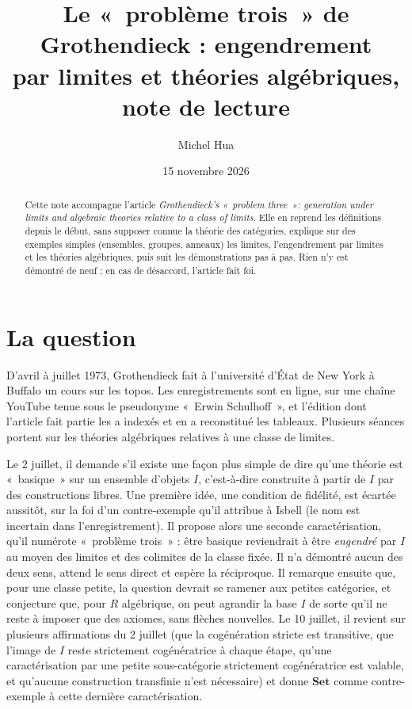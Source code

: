 \documentclass[11pt,a4paper]{amsart}
\title[Note de lecture : le «~problème trois~» de Grothendieck]{Le «~problème trois~» de Grothendieck : engendrement\\ par limites et théories algébriques,\\ note de lecture}
\author{Michel Hua}
\date{15 novembre 2026}
\theoremstyle{definition}
\theoremstyle{plain}
\theoremstyle{remark}
\newcommand{\Set}{\mathbf{Set}}
\begin{document}
\begin{abstract}
Cette note accompagne l'article \emph{Grothendieck's «~problem three~»: generation under limits and algebraic theories relative to a class of limits}. Elle en reprend les définitions depuis le début, sans supposer connue la théorie des catégories, explique sur des exemples simples (ensembles, groupes, anneaux) les limites, l'engendrement par limites et les théories algébriques, puis suit les démonstrations pas à pas. Rien n'y est démontré de neuf ; en cas de désaccord, l'article fait foi.
\end{abstract}

\maketitle

\section{La question}

D'avril à juillet 1973, Grothendieck fait à l'université d'État de New York à Buffalo un cours sur les topos. Les enregistrements sont en ligne, sur une chaîne YouTube tenue sous le pseudonyme «~Erwin Schulhoff~», et l'édition dont l'article fait partie les a indexés et en a reconstitué les tableaux. Plusieurs séances portent sur les théories algébriques relatives à une classe de limites.

Le 2 juillet, il demande s'il existe une façon plus simple de dire qu'une théorie est «~basique~» sur un ensemble d'objets $I$, c'est-à-dire construite à partir de $I$ par des constructions libres. Une première idée, une condition de fidélité, est écartée aussitôt, sur la foi d'un contre-exemple qu'il attribue à Isbell (le nom est incertain dans l'enregistrement). Il propose alors une seconde caractérisation, qu'il numérote «~problème trois~» : être basique reviendrait à être \emph{engendré} par $I$ au moyen des limites et des colimites de la classe fixée. Il n'a démontré aucun des deux sens, attend le sens direct et espère la réciproque. Il remarque ensuite que, pour une classe petite, la question devrait se ramener aux petites catégories, et conjecture que, pour $R$ algébrique, on peut agrandir la base $I$ de sorte qu'il ne reste à imposer que des axiomes, sans flèches nouvelles. Le 10 juillet, il revient sur plusieurs affirmations du 2 juillet (que la cogénération stricte est transitive, que l'image de $I$ reste strictement cogénératrice à chaque étape, qu'une caractérisation par une petite sous-catégorie strictement cogénératrice est valable, et qu'aucune construction transfinie n'est nécessaire) et donne $\Set$ comme contre-exemple à cette dernière caractérisation.
\end{document}
